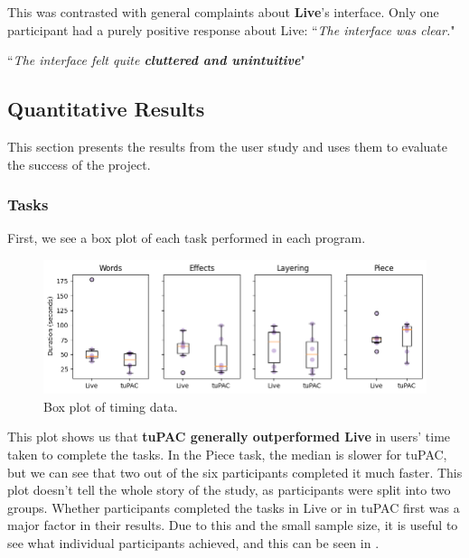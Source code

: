 \documentclass[12pt,a4paper,oneside,openright]{report}
\newcommand{\quoteT}[1]{``\textit{#1}"}
\begin{document}
This was contrasted with general complaints about \textbf{Live}'s interface. Only one participant had a purely positive response about Live: \quoteT{The interface was clear.}


\quoteT{The interface felt quite \textbf{cluttered and unintuitive}}


\subsection{Quantitative Results}\label{sec:data}
This section presents the results from the user study and uses them to evaluate the success of the project.

\subsubsection{Tasks}
First, we see a box plot of each task performed in each program.

\begin{figure}[h]
    \centering
    \includegraphics[width = .9\linewidth]{images/box_plot.png}
    \caption{Box plot of timing data.}
    \label{fig:box_plot}
\end{figure}

This plot shows us that \textbf{tuPAC generally outperformed Live} in users' time taken to complete the tasks. In the Piece task, the median is slower for tuPAC, but we can see that two out of the six participants completed it much faster. This plot doesn't tell the whole story of the study, as participants were split into two groups. Whether participants completed the tasks in Live or in tuPAC first was a major factor in their results. Due to this and the small sample size, it is useful to see what individual participants achieved, and this can be seen in .
\end{document}
